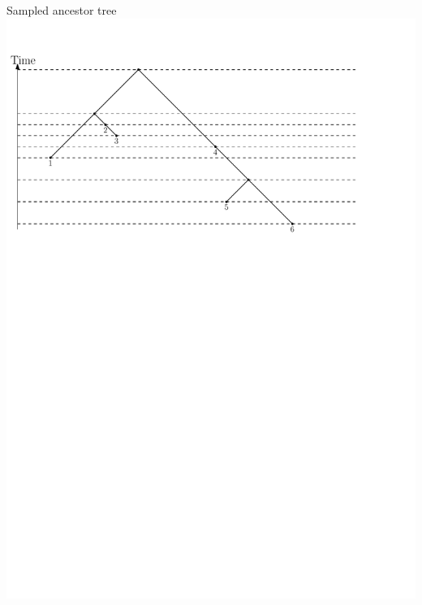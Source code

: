 \documentclass{beamer}
\begin{document}
\begin{frame}
\begin{block}{Sampled ancestor tree}
\includegraphics[width=\framewidth]{SampledAncestorTree}
\end{block}
\end{frame}
\end{document}
